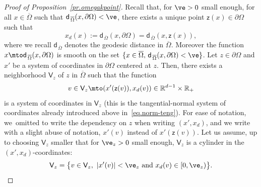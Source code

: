 \begin{proof}[Proof of Proposition~\ref{pr.omegakpoint}]
Recall that, for $\ve>0$ small enough, for all $x\in \overline \Omega$ such that $\mathsf d_{\, \overline \Omega}(x,\partial \Omega)<\ve$, there exists a unique
point $\mathsf z(x)\in \partial \Omega$ such that
\begin{equation}\label{eq.coordxdd}
x_d(x):=\mathsf d_{\, \overline \Omega}(x,\partial \Omega)=\mathsf d_{\, \overline \Omega}(x,\mathsf z(x)),
\end{equation}
where we recall $\mathsf d_{\, \overline \Omega}$ denotes the
geodesic distance in $\overline \Omega$. Moreover the function
$x\mto \mathsf d_{\, \overline \Omega}(x,\partial \Omega)$ is
smooth on the set $\{x\in \overline \Omega,\, \mathsf d_{\, \overline
\Omega}(x,\partial \Omega)<\ve\}$.
Let $z\in \partial \Omega$ and $x'$ be a system of coordinates in $\partial \Omega$ centered at $z$. Then, there exists a neighborhood $\mathsf V_z$ of $z$ in $\overline \Omega$ such that the function
\begin{equation}\label{eq.coord1}
v\in \mathsf V_z\mto (x'(\mathsf z(v)),x_d(v))\in \mathbb R^{d-1}\times \mathbb R_+
\end{equation}
is a system of coordinates in $\mathsf V_z$ (this is the
tangential-normal system of coordinates already introduced above in~\eqref{eq.norm-teng}). For ease of notation, we~omitted to write the dependency on $z$ when writing $(x',x_d)$, and we write with a slight abuse of notation, $x'(v)$ instead of $x'(\mathsf z(v))$.
Let us assume, up to choosing $\mathsf V_z$ smaller that for $\ve_z>0$ small enough, $\mathsf V_z$ is a cylinder in the $(x',x_d)$-coordinates:
\begin{equation}\label{eq.uz}
\mathsf V_z=\big \{v\in \mathsf V_z, \ \vert x'(v)\vert < \ve_z \text{ and } x_d(v)\in [0,\ve_z)\big \}.
\end{equation}


\end{proof}
